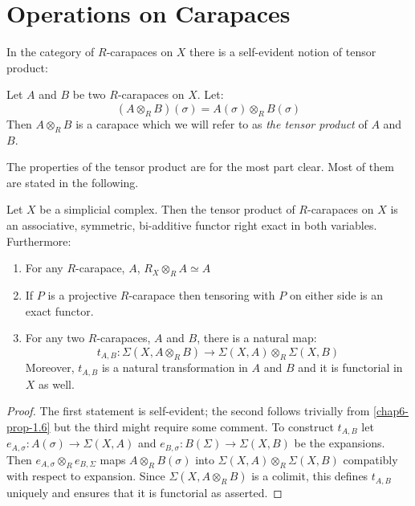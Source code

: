 \section{Operations on Carapaces}\label{chap6-sec-2}
\pageoriginale

In the category of $R$-carapaces on $X$ there is a self-evident notion of tensor product:

\begin{definition}\label{chap6-definition-2.1}
Let $A$ and $B$ be two $R$-carapaces on $X$. Let:
$$
(A \otimes_{R} B)(\sigma) = A(\sigma) \otimes_{R}B(\sigma)
$$
Then $A\otimes_{R}B$ is a carapace which we will refer to as \textit{the tensor product} of $A$ and $B$.

The properties of the tensor product are for the most part clear. Most of them are stated in the following.
\end{definition}

\begin{secprop}\label{chap6-prop-2.2}
Let $X$ be a simplicial complex. Then the tensor product of $R$-carapaces on $X$ is an associative, symmetric, bi-additive functor right exact in both variables. Furthermore:
   \begin{enumerate}[(1)]
   \item For any $R$-carapace, $A$, $R_{X}\otimes_{R}A \simeq A$\label{chap6-prop2.2-enum-(1)}
   \item If $P$ is a projective $R$-carapace then tensoring with $P$ on either side is 
   an exact functor.\label{chap6-prop2.2-enum-(2)}
   \item For any two $R$-carapaces, $A$ and $B$, there is a natural map:
      $$
      t_{A, B}:\Sigma(X, A\otimes_{R}B)\rightarrow \Sigma(X, A)\otimes_{R}\Sigma(X, B)
      $$
      Moreover, $t_{A, B}$ is a natural transformation in $A$ and $B$ and it is functorial in $X$ as well.\label{chap6-prop2.2-enum-(3)}
   \end{enumerate}
\end{secprop}

\begin{proof}
The first statement is self-evident; the second follows trivially from \ref{chap6-prop-1.6} but the third might require some comment. To construct $t_{A, B}$ let $e_{A, \sigma} : A(\sigma) \rightarrow \Sigma(X, A)$ and $e_{B, \sigma} : B(\Sigma) \rightarrow \Sigma(X, B)$ be the expansions. Then $e_{A, \sigma} \otimes_{R} e_{B, \Sigma}$ maps $A\otimes_{R} B(\sigma)$ into $\Sigma(X, A) \otimes_{R} \Sigma(X, B)$ compatibly with respect to expansion. Since $\Sigma(X, A \otimes_{R} B)$ is a colimit, this defines $t_{A, B}$ uniquely and ensures that it is functorial as asserted. 
\end{proof}

